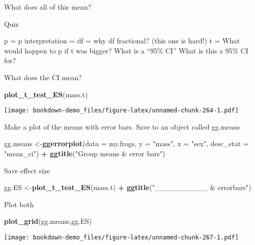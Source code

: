 \documentclass[]{book}
\newenvironment{Shaded}{\begin{snugshade}}{\end{snugshade}}
\newcommand{\KeywordTok}[1]{\textcolor[rgb]{0.13,0.29,0.53}{\textbf{#1}}}
\newcommand{\DataTypeTok}[1]{\textcolor[rgb]{0.13,0.29,0.53}{#1}}
\newcommand{\StringTok}[1]{\textcolor[rgb]{0.31,0.60,0.02}{#1}}
\newcommand{\OperatorTok}[1]{\textcolor[rgb]{0.81,0.36,0.00}{\textbf{#1}}}
\newcommand{\NormalTok}[1]{#1}
\theoremstyle{definition}
\theoremstyle{definition}
\theoremstyle{definition}
\theoremstyle{remark}
\begin{document}
What does all of this mean?

Quiz

p = p interpretation = df = why df fractional? (this one is hard!) t =
What would happen to p if t was bigger? What is a ``95\% CI'' What is
this a 95\% CI for?

What does the CI mean?

\begin{Shaded}
\begin{Highlighting}[]
\KeywordTok{plot_t_test_ES}\NormalTok{(mass.t)}
\end{Highlighting}
\end{Shaded}

\texttt{[image: bookdown-demo\_files/figure-latex/unnamed-chunk-264-1.pdf]}

Make a plot of the means with error bars. Save to an object called
gg.means

\begin{Shaded}
\begin{Highlighting}[]
\NormalTok{gg.means <-}\KeywordTok{ggerrorplot}\NormalTok{(}\DataTypeTok{data =}\NormalTok{ my.frogs,}
          \DataTypeTok{y =} \StringTok{"mass"}\NormalTok{,}
          \DataTypeTok{x =} \StringTok{"sex"}\NormalTok{,}
          \DataTypeTok{desc_stat =} \StringTok{"mean_ci"}\NormalTok{) }\OperatorTok{+}
\StringTok{  }\KeywordTok{ggtitle}\NormalTok{(}\StringTok{"Group means & error bars"}\NormalTok{)}
\end{Highlighting}
\end{Shaded}

Save effect size

\begin{Shaded}
\begin{Highlighting}[]
\NormalTok{gg.ES <-}\KeywordTok{plot_t_test_ES}\NormalTok{(mass.t) }\OperatorTok{+}
\StringTok{  }\KeywordTok{ggtitle}\NormalTok{(}\StringTok{"__________ & errorbars"}\NormalTok{)}
\end{Highlighting}
\end{Shaded}

Plot both

\begin{Shaded}
\begin{Highlighting}[]
\KeywordTok{plot_grid}\NormalTok{(gg.means,gg.ES)}
\end{Highlighting}
\end{Shaded}

\texttt{[image: bookdown-demo\_files/figure-latex/unnamed-chunk-267-1.pdf]}
\end{document}
